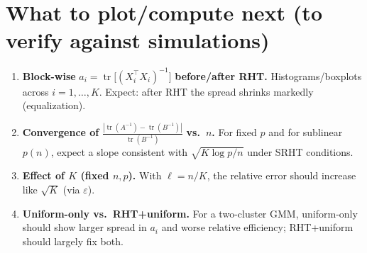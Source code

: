 \documentclass[11pt]{article}
\newcommand{\tr}{\operatorname{tr}}
\newcommand{\eps}{\varepsilon}
\theoremstyle{plain}
\begin{document}
\section{What to plot/compute next (to verify against simulations)}
\begin{enumerate}[leftmargin=*,label=\textbf{(\arabic*)}]
\item \textbf{Block-wise } \(a_i=\tr\!\big[(X_i^\top X_i)^{-1}\big]\) \textbf{ before/after RHT.}
Histograms/boxplots across \(i=1,\dots,K\). Expect: after RHT the spread shrinks markedly (equalization).

\item \textbf{Convergence of } \(\displaystyle \frac{|\tr(A^{-1})-\tr(B^{-1})|}{\tr(B^{-1})}\) \textbf{ vs.\ \(n\).}
For fixed \(p\) and for sublinear \(p(n)\), expect a slope consistent with \(\sqrt{K\log p/n}\) under SRHT conditions.

\item \textbf{Effect of \(K\) (fixed \(n,p\)).}
With \(\ell=n/K\), the relative error should increase like \(\sqrt{K}\) (via \(\eps\)).

\item \textbf{Uniform-only vs.\ RHT+uniform.}
For a two-cluster GMM, uniform-only should show larger spread in \(a_i\) and worse relative efficiency; RHT+uniform should largely fix both.
\end{enumerate}
\end{document}

